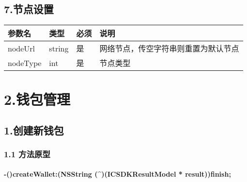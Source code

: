 \documentclass[letterpaper,10pt,english]{sphinxmanual}
\begin{document}
\subsection{7.节点设置}
\label{\detokenize{BCBWalletSDK_u63a5_u53e3_u8bf4_u660e:id16}}


\begin{savenotes}\sphinxattablestart
\centering
\begin{tabulary}{\linewidth}[t]{|T|T|T|T|}
\hline
\sphinxstyletheadfamily 
参数名
&\sphinxstyletheadfamily 
类型
&\sphinxstyletheadfamily 
必须
&\sphinxstyletheadfamily 
说明
\\
\hline
nodeUrl
&
string
&
是
&
网络节点，传空字符串则重置为默认节点
\\
\hline
nodeType
&
int
&
是
&
节点类型
\\
\hline
\end{tabulary}
\par
\sphinxattableend\end{savenotes}


\section{2.钱包管理}
\label{\detokenize{BCBWalletSDK_u63a5_u53e3_u8bf4_u660e:id17}}

\subsection{1.创建新钱包}
\label{\detokenize{BCBWalletSDK_u63a5_u53e3_u8bf4_u660e:id18}}

\subsubsection{1.1 方法原型}
\label{\detokenize{BCBWalletSDK_u63a5_u53e3_u8bf4_u660e:id19}}

\paragraph{-()createWallet:(NSString (\textasciicircum{})(ICSDKResultModel * result))finish;}
\label{\detokenize{BCBWalletSDK_u63a5_u53e3_u8bf4_u660e:void-createwallet-nsstring-name-password-nsstring-password-recommend-nsstring-recommend-finish-void-icsdkresultmodel-result-finish}}
\end{document}
